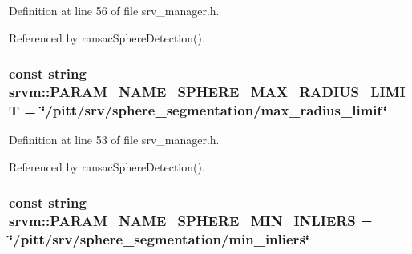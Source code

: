 Definition at line 56 of file srv\-\_\-manager.\-h.



Referenced by ransac\-Sphere\-Detection().

\hypertarget{namespacesrvm_ac79f9145796395f45f9c06cefc6876aa}{
\subsubsection[{P\-A\-R\-A\-M\-\_\-\-N\-A\-M\-E\-\_\-\-S\-P\-H\-E\-R\-E\-\_\-\-M\-A\-X\-\_\-\-R\-A\-D\-I\-U\-S\-\_\-\-L\-I\-M\-I\-T}]{\setlength{\rightskip}{0pt plus 5cm}const string srvm\-::\-P\-A\-R\-A\-M\-\_\-\-N\-A\-M\-E\-\_\-\-S\-P\-H\-E\-R\-E\-\_\-\-M\-A\-X\-\_\-\-R\-A\-D\-I\-U\-S\-\_\-\-L\-I\-M\-I\-T = \char`\"{}/pitt/srv/sphere\-\_\-segmentation/max\-\_\-radius\-\_\-limit\char`\"{}}}\label{namespacesrvm_ac79f9145796395f45f9c06cefc6876aa}


Definition at line 53 of file srv\-\_\-manager.\-h.



Referenced by ransac\-Sphere\-Detection().

\hypertarget{namespacesrvm_a3c779659d33a4785a807abe53c2bf52f}{
\subsubsection[{P\-A\-R\-A\-M\-\_\-\-N\-A\-M\-E\-\_\-\-S\-P\-H\-E\-R\-E\-\_\-\-M\-I\-N\-\_\-\-I\-N\-L\-I\-E\-R\-S}]{\setlength{\rightskip}{0pt plus 5cm}const string srvm\-::\-P\-A\-R\-A\-M\-\_\-\-N\-A\-M\-E\-\_\-\-S\-P\-H\-E\-R\-E\-\_\-\-M\-I\-N\-\_\-\-I\-N\-L\-I\-E\-R\-S = \char`\"{}/pitt/srv/sphere\-\_\-segmentation/min\-\_\-inliers\char`\"{}}}\label{namespacesrvm_a3c779659d33a4785a807abe53c2bf52f}



